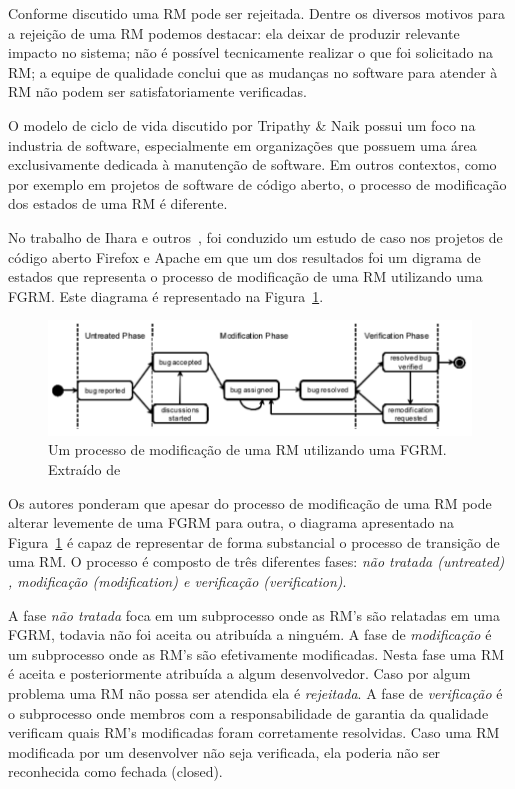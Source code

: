 Conforme discutido uma RM pode ser rejeitada. Dentre os diversos motivos para a
rejeição de uma RM podemos destacar: ela deixar de produzir relevante impacto no
sistema; não é possível tecnicamente realizar o que foi solicitado na RM; a
equipe de qualidade conclui que as mudanças no software para atender à RM não
podem ser satisfatoriamente verificadas.
\todoend


O modelo de ciclo de vida discutido por Tripathy \& Naik possui um foco na
industria de software, especialmente em organizações que possuem uma área
exclusivamente dedicada à manutenção de software. Em outros contextos, como por
exemplo em projetos de software de código aberto, o processo de modificação dos
estados de uma RM é diferente.

No trabalho de Ihara e outros~\cite{ihara2009analysis}, foi conduzido um estudo
de caso nos projetos de código aberto Firefox e Apache em que um dos resultados
foi um digrama de estados que representa o processo de modificação de uma RM
utilizando uma FGRM. Este diagrama é representado na
Figura~\ref{fig:diagrama-estado-rm-codigo-aberto}.

\begin{figure}[htpb]
	\centering
	\includegraphics[width=0.8\linewidth]{./chapter-manutencao-software-visao-geral/img/diagrama-estado-rm-codigo-aberto.pdf}
	\caption{Um processo de modificação de uma RM utilizando uma FGRM. Extraído
	de~\cite{ihara2009analysis}}
	\label{fig:diagrama-estado-rm-codigo-aberto}
\end{figure}

Os autores ponderam que apesar do processo de modificação de uma RM pode alterar
levemente de uma FGRM para outra, o diagrama apresentado na
Figura~\ref{fig:diagrama-estado-rm-codigo-aberto} é capaz de representar de
forma substancial o processo de transição de uma RM. O processo é composto de
três diferentes fases: \textit{não tratada (untreated) , modificação
	(modification) e verificação (verification)}.

A fase \textit{não tratada} foca em um subprocesso onde as RM's são relatadas em
uma FGRM, todavia não foi aceita ou atribuída a ninguém. A fase de
\textit{modificação} é um subprocesso onde as RM's são efetivamente modificadas.
Nesta fase uma RM é aceita e posteriormente atribuída a algum desenvolvedor.
Caso por algum problema uma RM não possa ser atendida ela é \textit{rejeitada}.
A fase de \textit{verificação} é o subprocesso onde membros com a
responsabilidade de garantia da qualidade verificam quais RM's modificadas foram
corretamente resolvidas. Caso uma RM modificada por um desenvolver não seja
verificada, ela poderia não ser reconhecida como fechada (closed).

